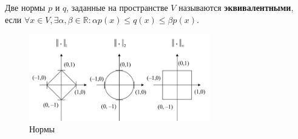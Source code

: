 \documentclass[12pt, a4paper]{article}
\begin{document}
\begin{enumerate}
		Две нормы $p$ и $q$, заданные на пространстве $V$ называются \textbf{эквивалентными}, если 
		$\forall x \in V, \exists \alpha,\beta \in \mathbb{R}: \alpha p(x) \le q(x) \le \beta p(x)$.
		
		\begin{figure}[!h]
			\center
			\includegraphics[width=0.7\textwidth]{pic1}
			\caption{Нормы}
			\label{pic1}
		\end{figure}		
		
	\end{enumerate}
	
	
\end{document}
